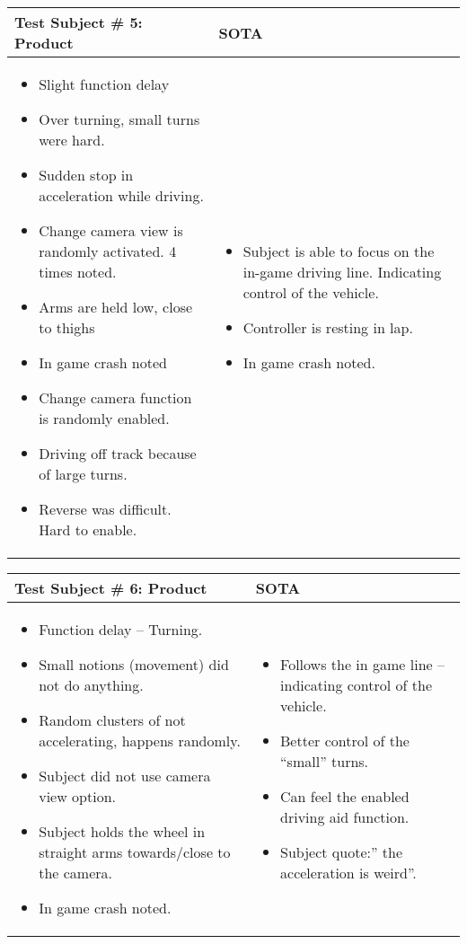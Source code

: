 \begin{table}[!htbp]
\centering
\begin{tabular}{| p{3.4in} | p{2in} |}
\hline
	\textbf{Test Subject \# 5: Product} & \textbf{SOTA}\\
\hline
	\begin{itemize}
		\item Slight function delay
		\item Over turning, small turns were hard.
		\item Sudden stop in acceleration while driving.
		\item Change camera view is randomly activated. 4 times noted.
		\item Arms are held low, close to thighs
		\item In game crash noted
		\item Change camera function is randomly enabled.
		\item Driving off track because of large turns.
		\item Reverse was difficult. Hard to enable.
	\end{itemize}
	&
	\begin{itemize}
		\item Subject is able to focus on the in-game driving line. Indicating control of the vehicle.
		\item Controller is resting in lap.
		\item In game crash noted.
	\end{itemize}
	\\
\hline
\end{tabular}
\end{table}


\begin{table}[!htbp]
\centering
\begin{tabular}{| p{3.4in} | p{2in} |}
\hline
	\textbf{Test Subject \# 6: Product} & \textbf{SOTA}\\
\hline
	\begin{itemize}
		\item Function delay – Turning.
		\item Small notions (movement) did not do anything.
		\item Random clusters of not accelerating, happens randomly.
		\item Subject did not use camera view option.
		\item Subject holds the wheel in straight arms towards/close to the camera.
		\item In game crash noted.
	\end{itemize}
	&
	\begin{itemize}
		\item Follows the in game line – indicating control of the vehicle.
		\item Better control of the “small” turns.
		\item Can feel the enabled driving aid function.
		\item Subject quote:” the acceleration is weird”.
	\end{itemize}
	\\
\hline
\end{tabular}
\end{table}


